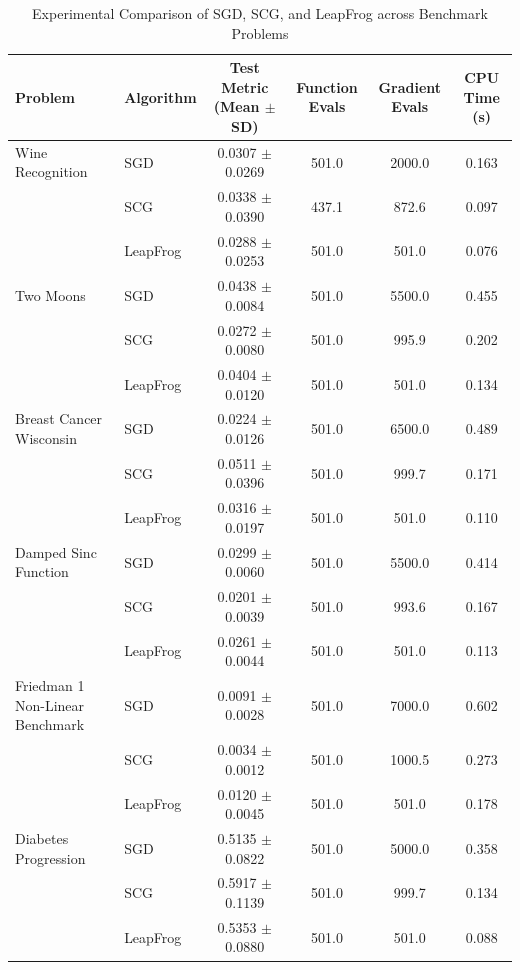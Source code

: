 \documentclass[conference]{IEEEtran}
\begin{document}
\begin{table}[t]
\centering
\caption{Experimental Comparison of SGD, SCG, and LeapFrog across Benchmark Problems}
\label{tab:comparison}
\begin{tabular}{llcccc}
\hline
Problem & Algorithm & Test Metric (Mean $\pm$ SD) & Function Evals & Gradient Evals & CPU Time (s) \\
\hline
Wine Recognition & SGD & 0.0307 $\pm$ 0.0269 & 501.0 & 2000.0 & 0.163 \\
 & SCG & 0.0338 $\pm$ 0.0390 & 437.1 & 872.6 & 0.097 \\
 & LeapFrog & 0.0288 $\pm$ 0.0253 & 501.0 & 501.0 & 0.076 \\
\hline
Two Moons & SGD & 0.0438 $\pm$ 0.0084 & 501.0 & 5500.0 & 0.455 \\
 & SCG & 0.0272 $\pm$ 0.0080 & 501.0 & 995.9 & 0.202 \\
 & LeapFrog & 0.0404 $\pm$ 0.0120 & 501.0 & 501.0 & 0.134 \\
\hline
Breast Cancer Wisconsin & SGD & 0.0224 $\pm$ 0.0126 & 501.0 & 6500.0 & 0.489 \\
 & SCG & 0.0511 $\pm$ 0.0396 & 501.0 & 999.7 & 0.171 \\
 & LeapFrog & 0.0316 $\pm$ 0.0197 & 501.0 & 501.0 & 0.110 \\
\hline
Damped Sinc Function & SGD & 0.0299 $\pm$ 0.0060 & 501.0 & 5500.0 & 0.414 \\
 & SCG & 0.0201 $\pm$ 0.0039 & 501.0 & 993.6 & 0.167 \\
 & LeapFrog & 0.0261 $\pm$ 0.0044 & 501.0 & 501.0 & 0.113 \\
\hline
Friedman 1 Non-Linear Benchmark & SGD & 0.0091 $\pm$ 0.0028 & 501.0 & 7000.0 & 0.602 \\
 & SCG & 0.0034 $\pm$ 0.0012 & 501.0 & 1000.5 & 0.273 \\
 & LeapFrog & 0.0120 $\pm$ 0.0045 & 501.0 & 501.0 & 0.178 \\
\hline
Diabetes Progression & SGD & 0.5135 $\pm$ 0.0822 & 501.0 & 5000.0 & 0.358 \\
 & SCG & 0.5917 $\pm$ 0.1139 & 501.0 & 999.7 & 0.134 \\
 & LeapFrog & 0.5353 $\pm$ 0.0880 & 501.0 & 501.0 & 0.088 \\
\hline
\end{tabular}
\end{table}
\end{document}
